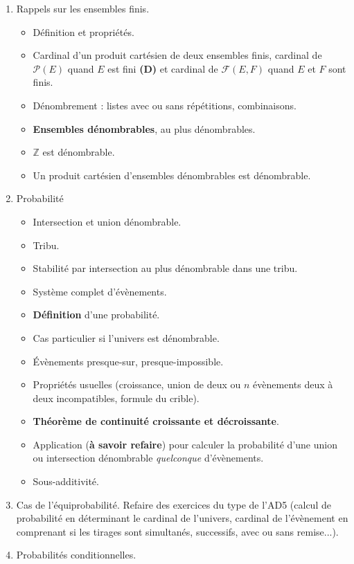 \documentclass[twoside,a4paper,french,10pt]{VcCours}
\begin{document}
  \begin{enumerate}
  \item Rappels sur les ensembles finis.
    \begin{itemize}
    \item Définition et propriétés.
    \item Cardinal d'un produit cartésien de deux ensembles finis, 
    cardinal de $\mathcal{P}(E)$ quand $E$ est fini \textbf{(D)} et cardinal de $\mathcal{F}(E,F)$ quand $E$ et $F$ sont finis.
    \item Dénombrement : listes avec ou sans répétitions, combinaisons. 
    \item \textbf{Ensembles dénombrables}, au plus dénombrables.
    \item $\mathbb{Z}$ est dénombrable.%
    \item Un produit cartésien d'ensembles dénombrables est dénombrable.
    \end{itemize}
  \item Probabilité
  \begin{itemize}
  \item Intersection et union dénombrable.
  \item Tribu.
  \item Stabilité par intersection au plus dénombrable dans une tribu.
  \item Système complet d'évènements.
  \item \textbf{Définition} d'une probabilité.
  \item Cas particulier si l'univers est dénombrable.
  \item Évènements presque-sur, presque-impossible.
  \item Propriétés usuelles (croissance, union de deux ou $n$ évènements deux à deux incompatibles, formule du crible).
  \item \textbf{Théorème de continuité croissante et décroissante}.
  \item Application (\textbf{à savoir refaire}) pour calculer la probabilité d'une union ou intersection dénombrable \textit{quelconque} d'évènements.
  \item Sous-additivité.
  \end{itemize}
  \item Cas de l'équiprobabilité. Refaire des exercices du type de l'AD5 (calcul de probabilité en déterminant le cardinal de l'univers, cardinal de l'évènement en comprenant si les tirages sont simultanés, successifs, avec ou sans remise...).
  \item Probabilités conditionnelles.

\end{enumerate}
\end{document}
